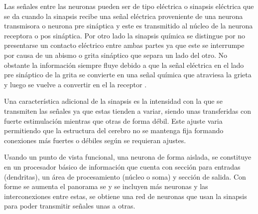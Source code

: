 		Las se\~{n}ales entre las neuronas pueden ser de tipo el\'{e}ctrica o sinapsis
	el\'{e}ctrica que se da cuando la sinapsis recibe una se\~{n}al el\'{e}ctrica proveniente
	de una neurona transmisora o neurona pre sin\'{a}ptica y este es transmitido al
	n\'{u}cleo de la neurona receptora o pos sin\'{a}ptica. Por otro lado la sinapsis qu\'{i}mica se distingue por no presentarse un contacto el\'{e}ctrico entre ambas partes ya que este se interrumpe por causa de un abismo o grita sin\'{a}ptico que separa un lado del otro. No obstante la informaci\'{o}n siempre fluye debido a que la se\~{n}al el\'{e}ctrica en el lado pre sin\'{a}ptico de la grita se convierte en una se\~{n}al qu\'{i}mica que atraviesa la grieta y luego se vuelve a convertir en el la receptor \cite{Kriesel2005}.
 	
 		Una caracter\'{i}stica adicional de la sinapsis es la intensidad con la que se
 	transmiten las se\~{n}ales ya que estas tienden a variar, siendo unas transferidas
 	con fuerte estimulaci\'{o}n mientras que otras de forma d\'{e}bil. Este ajuste varia
 	permitiendo que la estructura del cerebro no se mantenga fija formando conexiones m\'{a}s fuertes o d\'{e}biles seg\'{u}n se requieran ajustes.

 		Usando un punto de vista funcional, una neurona de forma aislada, se
 	constituye en un procesador b\'{a}sico de informaci\'{o}n que cuenta con secci\'{o}n para
 	entradas (dendritas), un \'{a}rea de procesamiento (n\'{u}cleo o soma) y secci\'{o}n de
 	salida. Con forme se aumenta el panorama se y se incluyen m\'{a}s neuronas y las interconexiones entre estas, se obtiene una red de neuronas que usan la sinapsis para poder transmitir se\~{n}ales unas a otras.
 		
 		
